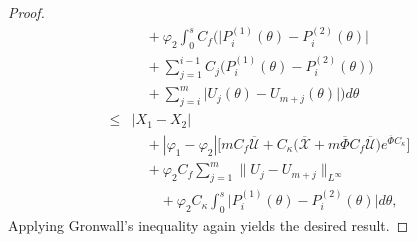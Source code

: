 \documentclass[10pt,a4paper]{amsart}
\begin{document}
\begin{proof}
\begin{align}
            &\quad + \varphi_2 \int_{0}^s C_f \Biggl( \bigg| P_i^{(1)}(\theta) - P_i^{(2)}(\theta) \bigg| \nonumber \\
            &\quad  + \sum_{j=1}^{i-1} C_j \bigg( P_i^{(1)}(\theta) - P_i^{(2)}(\theta) \bigg) \nonumber \\ 
            & \quad + \sum_{j=i}^m \bigg| U_j(\theta) - U_{m+j}(\theta) \bigg| \Biggr) d\theta \nonumber \\
        \leq& |X_1 - X_2| \nonumber \\
            &\quad + |\varphi_1 - \varphi_2| \bigg[ m C_f \overline{\mathcal{U}} + C_{\kappa} \bigg( \overline{\mathcal{X}} + m \overline{\Phi} C_f \overline{\mathcal{U}} \bigg) e^{\overline{\Phi} C_{\kappa}} \bigg] \nonumber \\
            &\quad + \varphi_2 C_f \sum_{j=1}^m \| U_j - U_{m+j} \|_{L^\infty} \nonumber \\
            &\qquad + \varphi_2 C_{\kappa} \int_0^s \bigg| P_i^{(1)}(\theta) - P_i^{(2)}(\theta) \bigg| d\theta, \label{eq:setup_for_gronwall}
\end{align}
Applying Gronwall's inequality again yields the desired result.
\end{proof}
\end{document}
